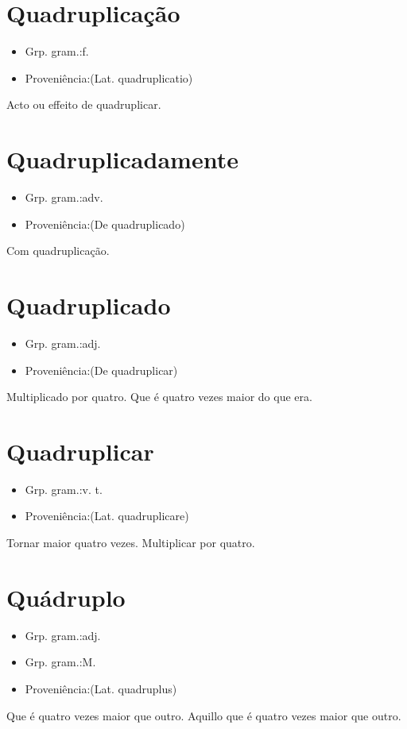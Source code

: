 \section{Quadruplicação}
\begin{itemize}
\item {Grp. gram.:f.}
\end{itemize}
\begin{itemize}
\item {Proveniência:(Lat. \textunderscore quadruplicatio\textunderscore )}
\end{itemize}
Acto ou effeito de quadruplicar.
\section{Quadruplicadamente}
\begin{itemize}
\item {Grp. gram.:adv.}
\end{itemize}
\begin{itemize}
\item {Proveniência:(De \textunderscore quadruplicado\textunderscore )}
\end{itemize}
Com quadruplicação.
\section{Quadruplicado}
\begin{itemize}
\item {Grp. gram.:adj.}
\end{itemize}
\begin{itemize}
\item {Proveniência:(De \textunderscore quadruplicar\textunderscore )}
\end{itemize}
Multiplicado por quatro.
Que é quatro vezes maior do que era.
\section{Quadruplicar}
\begin{itemize}
\item {Grp. gram.:v. t.}
\end{itemize}
\begin{itemize}
\item {Proveniência:(Lat. \textunderscore quadruplicare\textunderscore )}
\end{itemize}
Tornar maior quatro vezes.
Multiplicar por quatro.
\section{Quádruplo}
\begin{itemize}
\item {Grp. gram.:adj.}
\end{itemize}
\begin{itemize}
\item {Grp. gram.:M.}
\end{itemize}
\begin{itemize}
\item {Proveniência:(Lat. \textunderscore quadruplus\textunderscore )}
\end{itemize}
Que é quatro vezes maior que outro.
Aquillo que é quatro vezes maior que outro.
